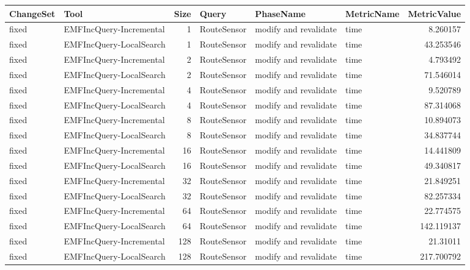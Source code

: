 \begin{table}
\centering
\footnotesize
\begin{tabular}{| l | l | r | l | l | l | r |}
\hline
\sf ChangeSet & \sf Tool & \sf Size & \sf Query & \sf PhaseName & \sf MetricName & \sf MetricValue\\\hline

fixed & EMFIncQuery-Incremental & 1 & RouteSensor & modify and revalidate & time & 8.260157\\\hline
fixed & EMFIncQuery-LocalSearch & 1 & RouteSensor & modify and revalidate & time & 43.253546\\\hline
fixed & EMFIncQuery-Incremental & 2 & RouteSensor & modify and revalidate & time & 4.793492\\\hline
fixed & EMFIncQuery-LocalSearch & 2 & RouteSensor & modify and revalidate & time & 71.546014\\\hline
fixed & EMFIncQuery-Incremental & 4 & RouteSensor & modify and revalidate & time & 9.520789\\\hline
fixed & EMFIncQuery-LocalSearch & 4 & RouteSensor & modify and revalidate & time & 87.314068\\\hline
fixed & EMFIncQuery-Incremental & 8 & RouteSensor & modify and revalidate & time & 10.894073\\\hline
fixed & EMFIncQuery-LocalSearch & 8 & RouteSensor & modify and revalidate & time & 34.837744\\\hline
fixed & EMFIncQuery-Incremental & 16 & RouteSensor & modify and revalidate & time & 14.441809\\\hline
fixed & EMFIncQuery-LocalSearch & 16 & RouteSensor & modify and revalidate & time & 49.340817\\\hline
fixed & EMFIncQuery-Incremental & 32 & RouteSensor & modify and revalidate & time & 21.849251\\\hline
fixed & EMFIncQuery-LocalSearch & 32 & RouteSensor & modify and revalidate & time & 82.257334\\\hline
fixed & EMFIncQuery-Incremental & 64 & RouteSensor & modify and revalidate & time & 22.774575\\\hline
fixed & EMFIncQuery-LocalSearch & 64 & RouteSensor & modify and revalidate & time & 142.119137\\\hline
fixed & EMFIncQuery-Incremental & 128 & RouteSensor & modify and revalidate & time & 21.31011\\\hline
fixed & EMFIncQuery-LocalSearch & 128 & RouteSensor & modify and revalidate & time & 217.700792\\\hline

\end{tabular}
\end{table}
